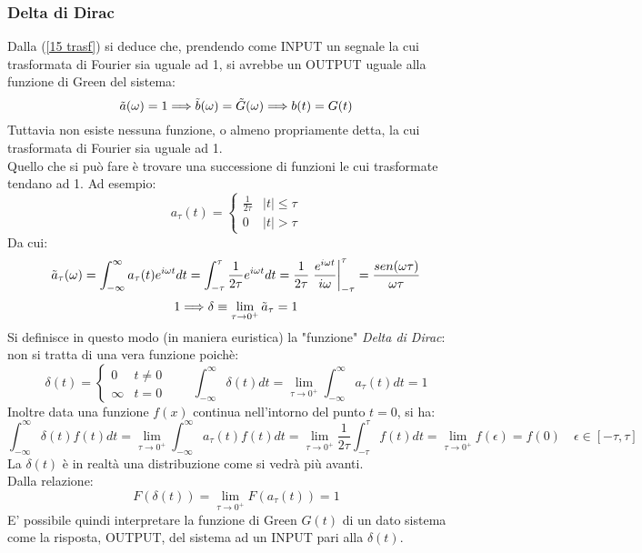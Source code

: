 \documentclass[twoside]{article}
\begin{document}
\subsubsection{Delta di Dirac}
Dalla (\ref{15 trasf}) si deduce che, prendendo come INPUT un segnale la cui trasformata di Fourier sia uguale ad 1, si avrebbe un OUTPUT uguale alla funzione di Green del sistema:
\begin{equation}
    \Tilde{a}(\omega)=1 \Longrightarrow \Tilde{b}(\omega)=\Tilde{G}(\omega)\Longrightarrow b(t)=G(t)
\end{equation}
Tuttavia non esiste nessuna funzione, o almeno propriamente detta, la cui trasformata di Fourier sia uguale ad 1.\\
Quello che si può fare è trovare una successione di funzioni le cui trasformate tendano ad 1. Ad esempio:
\begin{equation}\label{15 tau}
    a_\tau(t)=\begin{cases}
    \frac{1}{2\tau} & |t|\le \tau\\
    0 & |t|>\tau
\end{cases}
\end{equation}
Da cui:
\begin{equation}
    \Tilde{a}_\tau(\omega)=\int_{-\infty}^\infty a_\tau(t)e^{i\omega t}dt=\int_{-\tau}^\tau \frac{1}{2\tau}e^{i\omega t}dt=\frac{1}{2\tau}\left.\frac{e^{i\omega t}}{i\omega}\right|_{-\tau}^\tau=\frac{sen(\omega\tau)}{\omega\tau}
\end{equation}
\begin{equation}1
    \Longrightarrow \delta\equiv\lim_{\tau\to 0^+}\Tilde{a}_\tau=1
\end{equation}
Si definisce in questo modo (in maniera euristica) la "funzione" \textit{Delta di Dirac}: non si tratta di una vera funzione poichè:
\begin{equation}
    \delta(t)=\begin{cases}
    0 &  t \ne 0 \\
    \infty & t=0
    \end{cases} \qquad \int_{-\infty}^\infty\delta(t)dt=\lim_{\tau\to 0^+}\int_{-\infty}^\infty a_\tau(t)dt=1
\end{equation}
Inoltre data una funzione $f(x)$ continua nell'intorno del punto $t=0$, si ha:
\begin{equation}
    \int_{-\infty}^\infty\delta(t)f(t)dt=\lim_{\tau\to 0^+}\int_{-\infty}^\infty a_\tau(t)f(t)dt=\lim_{\tau\to 0^+}\frac{1}{2\tau}\int_{-\tau}^\tau f(t)dt=\lim_{\tau\to 0^+}f(\epsilon)=f(0) \quad \epsilon\in[-\tau,\tau]
\end{equation}
La $\delta(t)$ è in realtà una distribuzione come si vedrà più avanti.\\
Dalla relazione:
\begin{equation}
    F(\delta(t))=\lim_{\tau\to 0^+}F(a_\tau(t))=1
\end{equation}
E' possibile quindi interpretare la funzione di Green $G(t)$ di un dato sistema come la risposta, OUTPUT, del sistema ad un INPUT pari alla $\delta(t)$.
\end{document}
